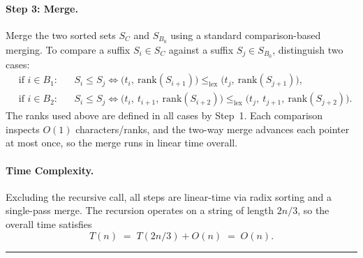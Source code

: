 \paragraph{Step 3: Merge.}
Merge the two sorted sets $S_C$ and $S_{B_0}$ using a standard comparison-based merging. To compare a suffix $S_i \in S_C$ against a suffix $S_j \in S_{B_0}$, distinguish two cases:
\[
\begin{aligned}
&\text{if } i \in B_1: && S_i \le S_j \iff \bigl(t_i,\ \mathrm{rank}(S_{i+1})\bigr) \le_{\mathrm{lex}} \bigl(t_j,\ \mathrm{rank}(S_{j+1})\bigr),\\
&\text{if } i \in B_2: && S_i \le S_j \iff \bigl(t_i,\ t_{i+1},\ \mathrm{rank}(S_{i+2})\bigr) \le_{\mathrm{lex}} \bigl(t_j,\ t_{j+1},\ \mathrm{rank}(S_{j+2})\bigr).
\end{aligned}
\]
The ranks used above are defined in all cases by Step~1. Each comparison inspects $O(1)$ characters/ranks, and the two-way merge advances each pointer at most once, so the merge runs in linear time overall.

\paragraph{Time Complexity.}
Excluding the recursive call, all steps are linear-time via radix sorting and a single-pass merge. The recursion operates on a string of length $2n/3$, so the overall time satisfies
\[
T(n) \;=\; T(2n/3) + O(n) \;=\; O(n).
\]

\par\noindent\rule{\textwidth}{0.4pt}


